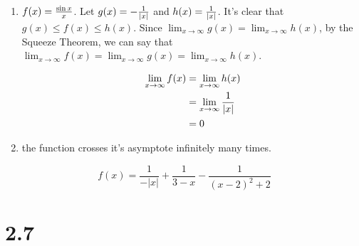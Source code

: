 \documentclass{../../../classes/anal}
\begin{document}
    \begin{enumerate}[label={(\alph*)}]
        \item {
            \(f(x) = {\sin x \over x}\). Let \(g(x) = -{1 \over |x|}\) and \(h(x) = {1 \over |x|}\). It's clear that \(g(x) \leq f(x) \leq h(x)\). Since \(\lim_{x\to\infty}g(x) = \lim_{x\to\infty}h(x)\), by the Squeeze Theorem, we can say that \(\lim_{x\to\infty}f(x) = \lim_{x\to\infty}g(x) = \lim_{x\to\infty}h(x)\). 

            \begin{equation}
                \begin{aligned}
                    \lim_{x\to\infty}f(x)
                    &= \lim_{x\to\infty}h(x) \\
                    &= \lim_{x\to\infty}{1 \over |x|} \\
                    &= 0 \\
                \end{aligned}
            \end{equation}
        }
        \item {

            the function crosses it's asymptote infinitely many times.
        }
    \end{enumerate}


    \[f(x) = \frac{1}{-\left|x\right|}+\frac{1}{3-x}-\frac{1}{\left(x-2\right)^{2}+2}\]

    \section*{2.7}

\end{document}
